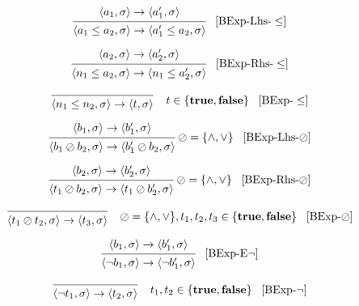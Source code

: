 \[
\begin{prooftree}
\hypo{
	\langle a_1, \sigma \rangle \rightarrow
	\langle a_1^\prime, \sigma \rangle 
} 
\infer1{
	\langle a_1 \leq a_2, \sigma \rangle \rightarrow  
	\langle a_1^\prime \leq a_2, \sigma \rangle
}
\end{prooftree} \; \; \; [\text{BExp-Lhs-}\leq]
\]

\[
\begin{prooftree}
\hypo{
	\langle a_2, \sigma \rangle \rightarrow
	\langle a_2^\prime, \sigma \rangle 
} 
\infer1{
	\langle n_1 \leq a_2, \sigma \rangle \rightarrow  
	\langle n_1 \leq a_2^\prime, \sigma \rangle
}
\end{prooftree} \; \; \; [\text{BExp-Rhs-}\leq]
\]

\[
\begin{prooftree}
\infer0{
	\langle n_1 \leq n_2, \sigma \rangle \rightarrow  
	\langle t, \sigma \rangle
}
\end{prooftree} \; \; \; \; t \in \{ \textbf{true}, \textbf{false} \} \; \; \; [\text{BExp-}\leq]
\]

\[
\begin{prooftree}
\hypo{
	\langle b_1, \sigma \rangle \rightarrow
	\langle b_1^\prime, \sigma \rangle 
} 
\infer1{
	\langle b_1 \oslash b_2, \sigma \rangle \rightarrow  
	\langle b_1^\prime \oslash b_2, \sigma \rangle
}
\end{prooftree} \; \oslash = \{\land,\lor\} \; \; \; [\text{BExp-Lhs-}\oslash]
\]

\[
\begin{prooftree}
\hypo{
	\langle b_2, \sigma \rangle \rightarrow
	\langle b_2^\prime, \sigma \rangle 
} 
\infer1{
	\langle t_1 \oslash b_2, \sigma \rangle \rightarrow  
	\langle t_1 \oslash b_2^\prime, \sigma \rangle
}
\end{prooftree} \; \oslash = \{\land,\lor\} \; \; \; [\text{BExp-Rhs-}\oslash]
\]

\[
\begin{prooftree}
\infer0{
	\langle t_1 \oslash t_2, \sigma \rangle \rightarrow  
	\langle t_3,  \sigma \rangle
}
\end{prooftree} \; \; \; \; \oslash = \{\land,\lor\}, t_1, t_2, t_3 \in \{ \textbf{true}, \textbf{false} \}  \; \; \; [\text{BExp-}\oslash]
\]

\[
\begin{prooftree}
\hypo{
	\langle b_1, \sigma \rangle \rightarrow  
	\langle b_1^\prime,  \sigma \rangle
}
\infer1{
	\langle \neg b_1, \sigma \rangle \rightarrow  
	\langle \neg b_1^\prime,  \sigma \rangle
}
\end{prooftree} \; \; \; [\text{BExp-E}\neg]
\]

\[
\begin{prooftree}
\infer0{
	\langle \neg t_1, \sigma \rangle \rightarrow  
	\langle t_2,  \sigma \rangle
}
\end{prooftree} \; \; \; \; t_1, t_2 \in \{ \textbf{true}, \textbf{false} \}  \; \; \; [\text{BExp-}\neg]
\]


